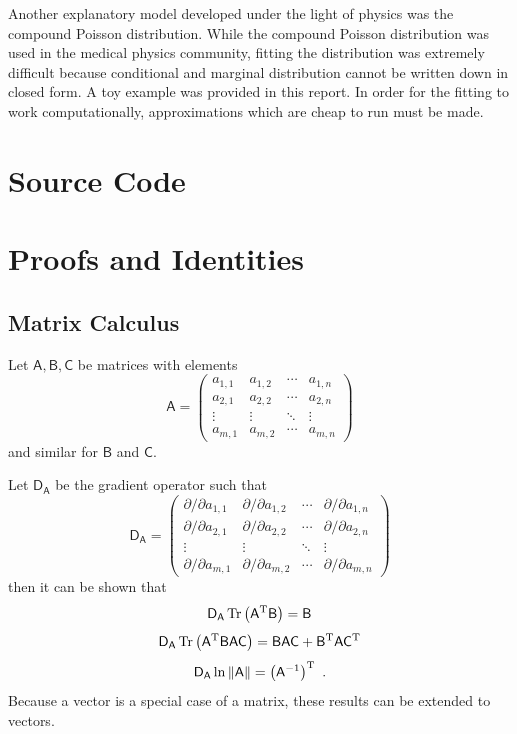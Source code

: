 \documentclass[12pt]{report}
\DeclareMathOperator{\trace}{Tr}
\newcommand{\T}{^\textup{T}}
\newcommand{\matr}[1]{\mathsf{#1}}
\begin{document}
Another explanatory model developed under the light of physics was the compound Poisson distribution. While the compound Poisson distribution was used in the medical physics community, fitting the distribution was extremely difficult because conditional and marginal distribution cannot be written down in closed form. A toy example was provided in this report. In order for the fitting to work computationally, approximations which are cheap to run must be made.

\appendix

\chapter{Source Code}

\chapter{Proofs and Identities}

\section{Matrix Calculus}\label{chapter:matrixCalculus}
Let $\matr{A},\matr{B},\matr{C}$ be matrices with elements
\begin{equation*}
\matr{A}=
\begin{pmatrix}
a_{1,1}&a_{1,2}&\cdots&a_{1,n} \\
a_{2,1}&a_{2,2}&\cdots&a_{2,n} \\
\vdots&\vdots&\ddots&\vdots \\
a_{m,1}&a_{m,2}&\cdots&a_{m,n} 
\end{pmatrix}
\end{equation*}
and similar for $\matr{B}$ and $\matr{C}$.

Let $\matr{D_{A}}$ be the gradient operator such that
\begin{equation*}
\matr{D_{A}}=
\begin{pmatrix}
\partial/\partial a_{1,1}&\partial/\partial a_{1,2}&\cdots&\partial/\partial a_{1,n} \\
\partial/\partial a_{2,1}&\partial/\partial a_{2,2}&\cdots&\partial/\partial a_{2,n} \\
\vdots&\vdots&\ddots&\vdots \\
\partial/\partial a_{m,1}&\partial/\partial a_{m,2}&\cdots&\partial/\partial a_{m,n} 
\end{pmatrix}
\end{equation*}
then it can be shown that \cite{petersen2008matrix}
\begin{equation}
\matr{D_{A}}\trace\left(\matr{A}\T\matr{B}\right) = \matr{B}
\end{equation}
\begin{equation}
\matr{D_{A}}\trace\left(\matr{A}\T\matr{B}\matr{A}\matr{C}\right) = \matr{B}\matr{A}\matr{C}+\matr{B}\T\matr{A}\matr{C}\T
\end{equation}
\begin{equation}
\matr{D_{A}}\ln\left\|\matr{A}\right\| = \left(\matr{A}^{-1}\right)\T \ .
\end{equation}
Because a vector is a special case of a matrix, these results can be extended to vectors.
\end{document}
